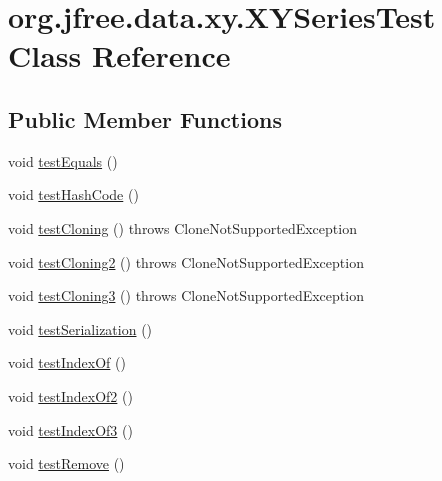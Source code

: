 \hypertarget{classorg_1_1jfree_1_1data_1_1xy_1_1_x_y_series_test}{}\section{org.\+jfree.\+data.\+xy.\+X\+Y\+Series\+Test Class Reference}
\label{classorg_1_1jfree_1_1data_1_1xy_1_1_x_y_series_test}
\subsection*{Public Member Functions}
\begin{DoxyCompactItemize}
\item 
void \mbox{\hyperlink{classorg_1_1jfree_1_1data_1_1xy_1_1_x_y_series_test_a1a666ceff17c1f8687ed0e7bf9adea4b}{test\+Equals}} ()
\item 
void \mbox{\hyperlink{classorg_1_1jfree_1_1data_1_1xy_1_1_x_y_series_test_a8081cbcc5453fbaa96b8a673dd215c96}{test\+Hash\+Code}} ()
\item 
void \mbox{\hyperlink{classorg_1_1jfree_1_1data_1_1xy_1_1_x_y_series_test_a7720d23ce7aa9d4a4273efe621c95423}{test\+Cloning}} ()  throws Clone\+Not\+Supported\+Exception 
\item 
void \mbox{\hyperlink{classorg_1_1jfree_1_1data_1_1xy_1_1_x_y_series_test_a174ddafb6b57e024043ce8ffd52dbbaf}{test\+Cloning2}} ()  throws Clone\+Not\+Supported\+Exception 
\item 
void \mbox{\hyperlink{classorg_1_1jfree_1_1data_1_1xy_1_1_x_y_series_test_ad87c460ea8f19bc50567f216c0d4c4df}{test\+Cloning3}} ()  throws Clone\+Not\+Supported\+Exception 
\item 
void \mbox{\hyperlink{classorg_1_1jfree_1_1data_1_1xy_1_1_x_y_series_test_a30305e4b5b1d82e5871ae0c7b78f83f3}{test\+Serialization}} ()
\item 
void \mbox{\hyperlink{classorg_1_1jfree_1_1data_1_1xy_1_1_x_y_series_test_afe9a6c612ab7d07e3e68850bf5f4b819}{test\+Index\+Of}} ()
\item 
void \mbox{\hyperlink{classorg_1_1jfree_1_1data_1_1xy_1_1_x_y_series_test_ae9d56e99f45f47d74b580f467b0dfe20}{test\+Index\+Of2}} ()
\item 
void \mbox{\hyperlink{classorg_1_1jfree_1_1data_1_1xy_1_1_x_y_series_test_adfb2670bc0aa33f6df4c85a811d673a6}{test\+Index\+Of3}} ()
\item 
void \mbox{\hyperlink{classorg_1_1jfree_1_1data_1_1xy_1_1_x_y_series_test_a5dcbbb0b472c4a69d20fc68cf767cd3a}{test\+Remove}} ()

\end{DoxyCompactItemize}
